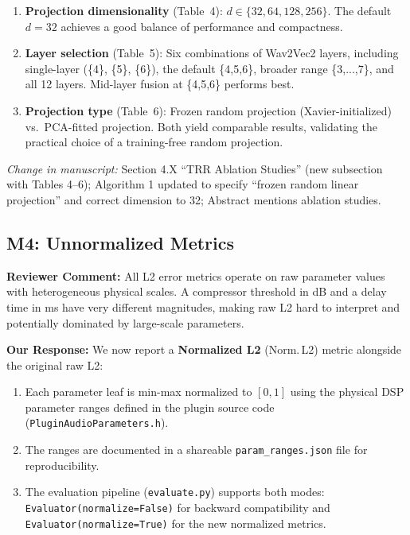 \documentclass[11pt]{article}
\newcommand{\reviewer}[1]{\textcolor{reviewercolor}{\textbf{Reviewer Comment:} #1}}
\newcommand{\response}[1]{\textcolor{responsecolor}{\textbf{Our Response:} #1}}
\newcommand{\change}[1]{\textit{Change in manuscript:} #1}
\begin{document}
\begin{enumerate}[leftmargin=*]
\item \textbf{Projection dimensionality} (Table~4): $d \in \{32, 64, 128, 256\}$. The default $d{=}32$ achieves a good balance of performance and compactness.
\item \textbf{Layer selection} (Table~5): Six combinations of Wav2Vec2 layers, including single-layer (\{4\}, \{5\}, \{6\}), the default \{4,5,6\}, broader range \{3,...,7\}, and all 12 layers. Mid-layer fusion at \{4,5,6\} performs best.
\item \textbf{Projection type} (Table~6): Frozen random projection (Xavier-initialized) vs.\ PCA-fitted projection. Both yield comparable results, validating the practical choice of a training-free random projection.
\end{enumerate}

\change{Section 4.X ``TRR Ablation Studies'' (new subsection with Tables 4--6); Algorithm 1 updated to specify ``frozen random linear projection'' and correct dimension to 32; Abstract mentions ablation studies.}

\subsection*{M4: Unnormalized Metrics}

\reviewer{All L2 error metrics operate on raw parameter values with heterogeneous physical scales. A compressor threshold in dB and a delay time in ms have very different magnitudes, making raw L2 hard to interpret and potentially dominated by large-scale parameters.}

\response{We now report a \textbf{Normalized L2} (Norm.\,L2) metric alongside the original raw L2:}

\begin{enumerate}[leftmargin=*]
\item Each parameter leaf is min-max normalized to $[0,1]$ using the physical DSP parameter ranges defined in the plugin source code (\texttt{PluginAudioParameters.h}).
\item The ranges are documented in a shareable \texttt{param\_ranges.json} file for reproducibility.
\item The evaluation pipeline (\texttt{evaluate.py}) supports both modes: \texttt{Evaluator(normalize=False)} for backward compatibility and \texttt{Evaluator(normalize=True)} for the new normalized metrics.
\end{enumerate}
\end{document}
